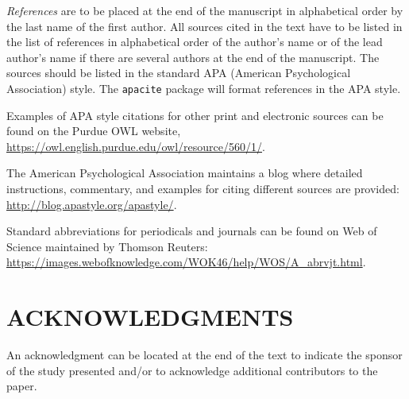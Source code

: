 \documentclass[10pt]{extarticle}
\begin{document}


\vspace{24pt}
\emph{References} are to be placed at the end of the manuscript in alphabetical order by the last name of the first author.  All sources cited in the text have to be listed in the list of references in alphabetical order of the author's name or of the lead author's name if there are several authors at the end of the manuscript.  The sources should be listed in the standard APA (American Psychological Association) style.  The \texttt{apacite} package will format references in the APA style. 

Examples of APA style citations for other print and electronic sources can be found on the Purdue OWL website, \url{https://owl.english.purdue.edu/owl/resource/560/1/}.

The American Psychological Association maintains a blog where detailed instructions, commentary, and examples for citing different sources are provided: \url{http://blog.apastyle.org/apastyle/}.

Standard abbreviations for periodicals and journals can be found on Web of Science maintained by Thomson Reuters: \url{https://images.webofknowledge.com/WOK46/help/WOS/A_abrvjt.html}.  

\section*{ACKNOWLEDGMENTS}

An acknowledgment can be located at the end of the text to indicate the sponsor of the study presented and/or to acknowledge additional contributors to the paper. 
\end{document}
